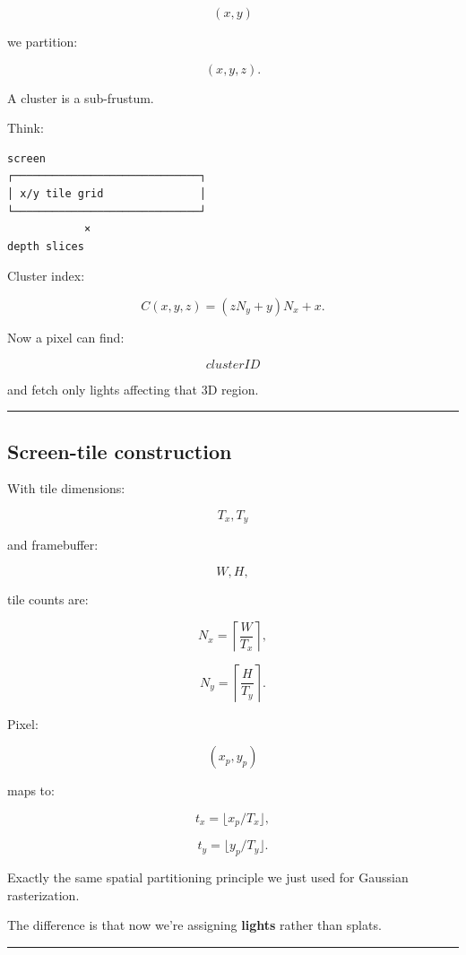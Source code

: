 \[
(x,y)
\]

we partition:

\[
(x,y,z).
\]

A cluster is a sub-frustum.

Think:

\begin{verbatim}
screen
┌─────────────────────────────┐
│ x/y tile grid               │
└─────────────────────────────┘
            ×
depth slices
\end{verbatim}

Cluster index:

\[
\boxed{
C(x,y,z)
=
(zN_y+y)N_x+x.
}
\]

Now a pixel can find:

\[
clusterID
\]

and fetch only lights affecting that 3D region.

\begin{center}\rule{0.5\linewidth}{0.5pt}\end{center}

\subsection{Screen-tile construction}\label{04-visual-computing-ii-ch040-screen-tile-construction}

\hypertarget{04-visual-computing-ii-ch040-screen-tile-construction}{}

With tile dimensions:

\[
T_x,T_y
\]

and framebuffer:

\[
W,H,
\]

tile counts are:

\[
N_x=
\left\lceil\frac{W}{T_x}\right\rceil,
\]

\[
N_y=
\left\lceil\frac{H}{T_y}\right\rceil.
\]

Pixel:

\[
(x_p,y_p)
\]

maps to:

\[
t_x=
\lfloor x_p/T_x\rfloor,
\]

\[
t_y=
\lfloor y_p/T_y\rfloor.
\]

Exactly the same spatial partitioning principle we just used for Gaussian rasterization.

The difference is that now we're assigning \textbf{lights} rather than splats.

\begin{center}\rule{0.5\linewidth}{0.5pt}\end{center}

